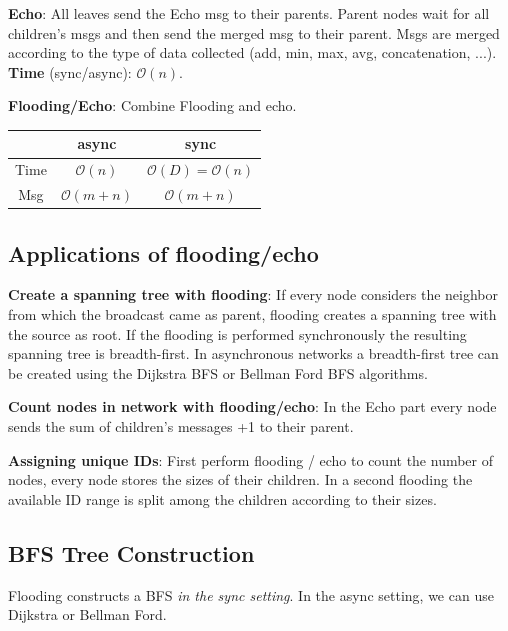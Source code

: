 \documentclass[a4paper, 8pt, landscape]{scrartcl}
\begin{document}
\begin{multicols*}{3}
\textbf{Echo}: All leaves send the Echo msg to their parents. Parent nodes wait for all children’s msgs and then send the merged msg to their parent. Msgs are merged according to the type of data collected (add, min, max, avg, concatenation, ...). \textbf{Time} (sync/async): $\mathcal{O}(n)$.

\columnbreak

\textbf{Flooding/Echo}: Combine Flooding and echo.

\vspace*{-2mm}
\begin{center}
\renewcommand{\arraystretch}{1.1}
\begin{tabular}{@{}ccc@{}}
	\hline 
	& async & sync \\ 
	\hline 
	Time & $\mathcal{O}(n)$ & $\mathcal{O}(D) = \mathcal{O}(n)$ \\ 
	Msg & $\mathcal{O}(m+n)$ & $\mathcal{O}(m+n)$ \\ 
	\hline 
\end{tabular} 
\end{center}

\subsection{Applications of flooding/echo}

\textbf{Create a spanning tree with flooding}: If every node considers the neighbor from which the broadcast came as parent, flooding creates a spanning tree with the source as root. If the flooding is performed synchronously the resulting spanning tree is breadth-first. In asynchronous networks a breadth-first tree can be created using the Dijkstra BFS or Bellman Ford BFS algorithms.

\textbf{Count nodes in network with flooding/echo}: In the Echo part every node sends the sum of children’s messages +1 to their parent.

\textbf{Assigning unique IDs}: First perform flooding / echo to count the number of nodes, every node stores the sizes of their children. In a second flooding the available ID range is split among the children according to their sizes.

\subsection{BFS Tree Construction}

Flooding constructs a BFS \textit{in the sync setting}. In the async setting, we can use Dijkstra or Bellman Ford.


\end{multicols*}
\end{document}
